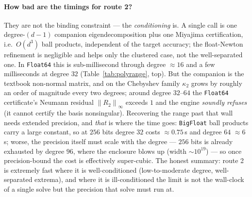 \documentclass[11pt,a4paper]{article}
\newcommand{\norm}[1]{\left\|#1\right\|}
\theoremstyle{plain}
\theoremstyle{definition}
\begin{document}
\paragraph{How bad are the timings for route 2?} They are not the binding constraint --- the
\emph{conditioning} is. A single call is one degree-$(d{-}1)$ companion eigendecomposition
plus one Miyajima certification, i.e.\ $O(d^3)$ ball products, independent of the target
accuracy; the float-Newton refinement is negligible and helps only the clustered case, not
the well-separated one. In \texttt{Float64} this is sub-millisecond through degree $\approx16$
and a few milliseconds at degree $32$ (Table~\ref{tab:polyrange}, top). But the companion is
the textbook non-normal matrix, and on the Chebyshev family $\kappa_2$ grows by roughly an
order of magnitude every two degrees; around degree $32$--$64$ the \texttt{Float64}
certificate's Neumann residual $\norm{R_2}_\infty$ exceeds $1$ and the engine \emph{soundly
refuses} (it cannot certify the basis nonsingular). Recovering the range past that wall needs
extended precision, and \emph{that} is where the time goes: \texttt{BigFloat} ball products
carry a large constant, so at $256$ bits degree $32$ costs $\approx0.75$\,s and degree $64$
$\approx6$\,s; worse, the precision itself must scale with the degree --- $256$ bits is
already exhausted by degree $96$, where the enclosure blows up (width $\sim10^{19}$) --- so
once precision-bound the cost is effectively super-cubic. The honest summary: route 2 is
extremely fast where it is well-conditioned (low-to-moderate degree, well-separated extrema),
and where it is ill-conditioned the limit is not the wall-clock of a single solve but the
precision that solve must run at.
\end{document}
